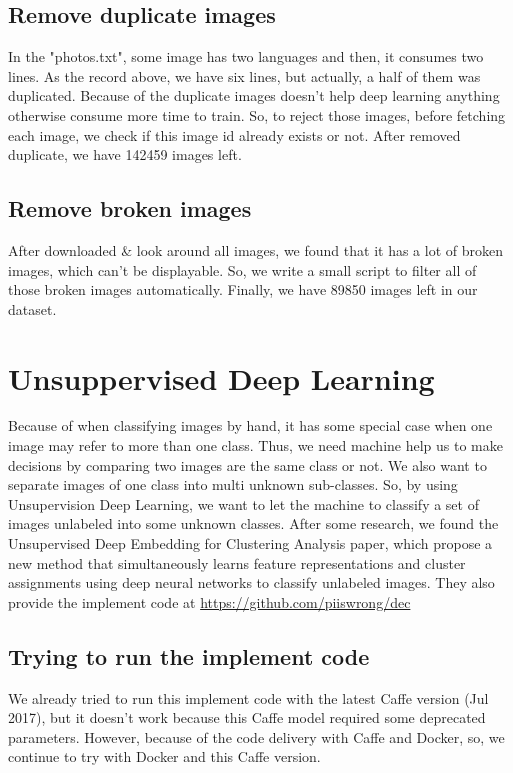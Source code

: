 \documentclass[11pt]{article}
\begin{document}
\subsection{Remove duplicate images}
In the "photos.txt", some image has two languages and then, it consumes two lines. As the record above, we have six lines, but actually, a half of them was duplicated. \newline
Because of the duplicate images doesn't help deep learning anything otherwise consume more time to train. So, to reject those images, before fetching each image, we check if this image id already exists or not. \newline
After removed duplicate, we have 142459 images left.
\subsection{Remove broken images}
After downloaded \& look around all images, we found that it has a lot of broken images, which can't be displayable. So, we write a small script to filter all of those broken images automatically. \newline
Finally, we have 89850 images left in our dataset.

\section{Unsuppervised Deep Learning}
Because of when classifying images by hand, it has some special case when one image may refer to more than one class. Thus, we need machine help us to make decisions by comparing two images are the same class or not. We also want to separate images of one class into multi unknown sub-classes. So, by using Unsupervision Deep Learning, we want to let the machine to classify a set of images unlabeled into some unknown classes. \newline
After some research, we found the Unsupervised Deep Embedding for Clustering Analysis\cite{dec} paper, which propose a new method that simultaneously learns feature representations and cluster assignments using deep neural networks to classify unlabeled images. They also provide the implement code at \href{https://github.com/piiswrong/dec}{https://github.com/piiswrong/dec}

\subsection{Trying to run the implement code}
We already tried to run this implement code with the latest Caffe version (Jul 2017), but it doesn't work because this Caffe model required some deprecated parameters. However, because of the code delivery with Caffe and Docker, so, we continue to try with Docker and this Caffe version.
\end{document}
